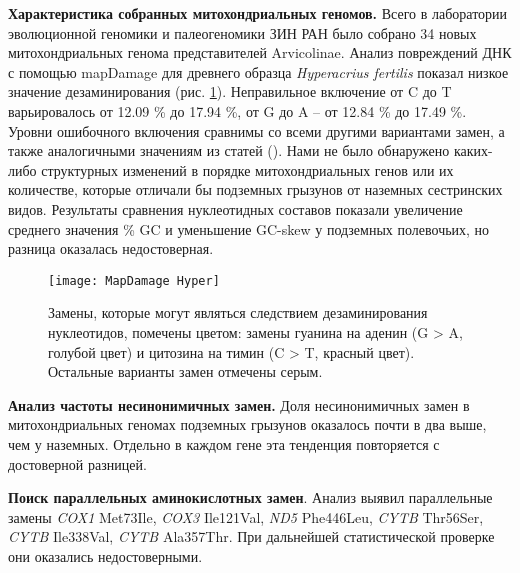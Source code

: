 \textbf{Характеристика собранных митохондриальных геномов.} Всего в лаборатории эволюционной геномики и палеогеномики ЗИН РАН было собрано 34 новых митохондриальных генома представителей Arvicolinae. Анализ повреждений ДНК с помощью mapDamage для древнего образца \textit{Hyperacrius fertilis} показал низкое значение дезаминирования (рис. \ref{MapDamage}). Неправильное включение от C до T варьировалось от 12.09 \% до 17.94 \%, от G до A -- от 12.84 \% до 17.49 \%. Уровни ошибочного включения сравнимы со всеми другими вариантами замен, а также аналогичными значениям из статей (\cite{Molto2017}). Нами не было обнаружено каких-либо структурных изменений в порядке митохондриальных генов или их количестве, которые отличали бы подземных грызунов от наземных сестринских видов. Результаты сравнения нуклеотидных составов показали увеличение среднего значения \% GC и уменьшение GC-skew у подземных полевочьих, но разница оказалась недостоверная.

\begin{figure}[h!]
	\begin{center}
		\texttt{[image: MapDamage Hyper]}
	\end{center}
	\caption{Замены, которые могут являться следствием дезаминирования нуклеотидов, помечены цветом: замены гуанина на аденин (G > A, голубой цвет) и цитозина на тимин (C > T, красный цвет). Остальные варианты замен отмечены серым.}\label{MapDamage}
\end{figure}

\textbf{Анализ частоты несинонимичных замен.} %
Доля несинонимичных замен в митохондриальных геномах подземных грызунов оказалось почти в два выше, чем у наземных. Отдельно в каждом гене эта тенденция повторяется с достоверной разницей.

\textbf{Поиск параллельных аминокислотных замен}. Анализ выявил параллельные замены \textit{COX1} Met73Ile, \textit{COX3} Ile121Val, \textit{ND5} Phe446Leu, \textit{CYTB} Thr56Ser, \textit{CYTB} Ile338Val, \textit{CYTB} Ala357Thr. При дальнейшей статистической проверке они оказались недостоверными. 

